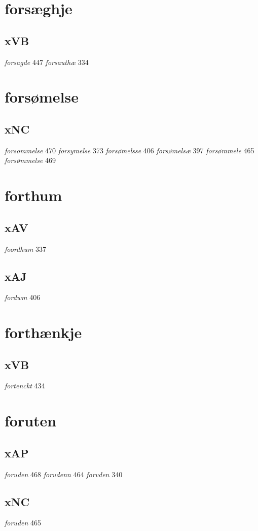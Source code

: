 \documentclass[a4paper,twocolumn]{article}
\begin{document}
\section{forsæghje}
\label{sec:orga4e0ce8}
\subsection{xVB}
\label{sec:org804b0e1}
\emph{forsagde} 447 \emph{forsauthæ} 334 
\section{forsømelse}
\label{sec:orga4815f1}
\subsection{xNC}
\label{sec:orgabd7df2}
\emph{forsommelse} 470 \emph{forsymelse} 373 \emph{forsømelsse} 406 \emph{forsømelsæ} 397 \emph{forsømmele} 465 \emph{forsømmelse} 469 
\section{forthum}
\label{sec:org7d38c64}
\subsection{xAV}
\label{sec:org47ce998}
\emph{foordhum} 337 
\subsection{xAJ}
\label{sec:org85d89af}
\emph{fordwm} 406 
\section{forthænkje}
\label{sec:orga8a71e6}
\subsection{xVB}
\label{sec:orga6e7006}
\emph{fortenckt} 434 
\section{foruten}
\label{sec:org4e68705}
\subsection{xAP}
\label{sec:orgdd8c41d}
\emph{foruden} 468 \emph{forudenn} 464 \emph{forvden} 340 
\subsection{xNC}
\label{sec:org389345d}
\emph{foruden} 465 
\end{document}
